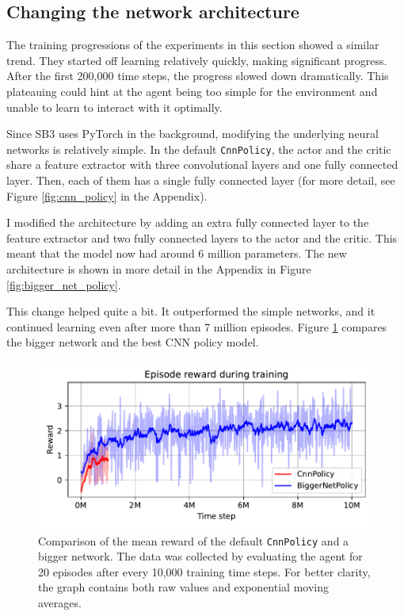 \documentclass[
  digital,     %
  oneside,     %
  nosansbold,  %
  nocolorbold, %
  lof,         %
  lot,         %
]{fithesis4}
\begin{document}
\subsection{Changing the network architecture}
\label{subsec:arch_change}

The training progressions of the experiments in this section showed a similar trend. They started off learning relatively quickly, making significant progress. After the first 200,000 time steps, the progress slowed down dramatically. This plateauing could hint at the agent being too simple for the environment and unable to learn to interact with it optimally.

Since SB3 uses PyTorch in the background, modifying the underlying neural networks is relatively simple. In the default \texttt{CnnPolicy}, the actor and the critic share a feature extractor with three convolutional layers and one fully connected layer. Then, each of them has a single fully connected layer (for more detail, see Figure \ref{fig:cnn_policy} in the Appendix).

I modified the architecture by adding an extra fully connected layer to the feature extractor and two fully connected layers to the actor and the critic. This meant that the model now had around 6 million parameters. The new architecture is shown in more detail in the Appendix in Figure \ref{fig:bigger_net_policy}.

This change helped quite a bit. It outperformed the simple networks, and it continued learning even after more than 7 million episodes. Figure \ref{fig:v3_bigger_net} compares the bigger network and the best CNN policy model.

\begin{figure}
    \includegraphics[width=1\linewidth]{graphs/v3_cnn_vs_biggernet.pdf}
    \caption{Comparison of the mean reward of the default \texttt{CnnPolicy} and a bigger network. The data was collected by evaluating the agent for 20 episodes after every 10,000 training time steps. For better clarity, the graph contains both raw values and exponential moving averages.}
    \label{fig:v3_bigger_net}
\end{figure}
\end{document}
